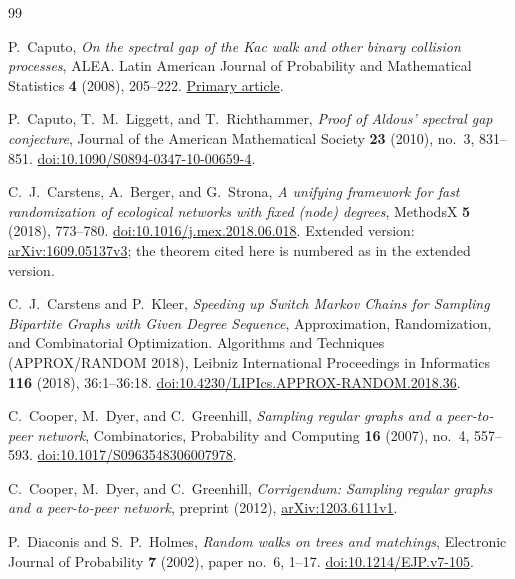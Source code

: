 \begin{thebibliography}{99}

P.~Caputo,
\emph{On the spectral gap of the Kac walk and other binary collision processes},
ALEA. Latin American Journal of Probability and Mathematical Statistics
\textbf{4} (2008), 205--222.
\href{https://alea.impa.br/articles/v4/04-10.pdf}{Primary article}.

P.~Caputo, T.~M.~Liggett, and T.~Richthammer,
\emph{Proof of Aldous' spectral gap conjecture},
Journal of the American Mathematical Society \textbf{23} (2010), no.~3, 831--851.
\href{https://doi.org/10.1090/S0894-0347-10-00659-4}{doi:10.1090/S0894-0347-10-00659-4}.

C.~J.~Carstens, A.~Berger, and G.~Strona,
\emph{A unifying framework for fast randomization of ecological networks with fixed (node) degrees},
MethodsX \textbf{5} (2018), 773--780.\newline
\href{https://doi.org/10.1016/j.mex.2018.06.018}{doi:10.1016/j.mex.2018.06.018}.
Extended version: \href{https://arxiv.org/abs/1609.05137v3}{arXiv:1609.05137v3};
the theorem cited here is numbered as in the extended version.

C.~J.~Carstens and P.~Kleer,
\emph{Speeding up Switch Markov Chains for Sampling Bipartite Graphs
with Given Degree Sequence},
Approximation, Randomization, and Combinatorial Optimization.
Algorithms and Techniques (APPROX/RANDOM 2018),
Leibniz International Proceedings in Informatics \textbf{116} (2018), 36:1--36:18.
\href{https://doi.org/10.4230/LIPIcs.APPROX-RANDOM.2018.36}{doi:10.4230/LIPIcs.APPROX-RANDOM.2018.36}.

C.~Cooper, M.~Dyer, and C.~Greenhill,
\emph{Sampling regular graphs and a peer-to-peer network},
Combinatorics, Probability and Computing \textbf{16} (2007), no.~4, 557--593.\newline
\href{https://doi.org/10.1017/S0963548306007978}{doi:10.1017/S0963548306007978}.

C.~Cooper, M.~Dyer, and C.~Greenhill,
\emph{Corrigendum: Sampling regular graphs and a peer-to-peer network},
preprint (2012),
\href{https://arxiv.org/abs/1203.6111v1}{arXiv:1203.6111v1}.

P.~Diaconis and S.~P.~Holmes,
\emph{Random walks on trees and matchings},
Electronic Journal of Probability \textbf{7} (2002), paper no.~6, 1--17.
\href{https://doi.org/10.1214/EJP.v7-105}{doi:10.1214/EJP.v7-105}.


\end{thebibliography}

